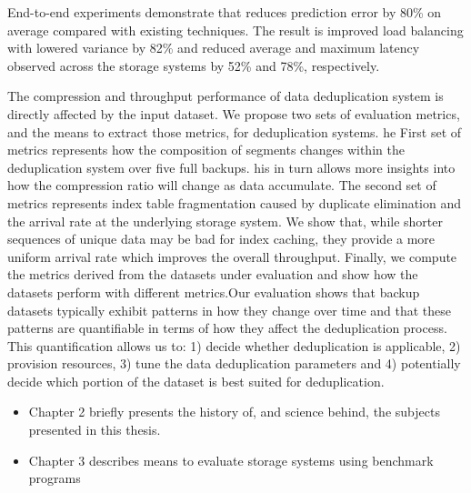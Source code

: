 End-to-end experiments demonstrate that \romano reduces prediction error by 80\% on average compared with existing techniques.
The result is improved load balancing with lowered variance by 82\% and reduced average and maximum latency observed across the storage systems by 52\% and 78\%, respectively.


The compression and throughput performance of data deduplication system is directly affected by the input dataset. 
We propose two sets of evaluation metrics, and the means to extract those metrics, for deduplication systems. 
he First set of metrics represents how the composition of segments changes within the deduplication system over five full backups. 
his in turn allows more insights into how the compression ratio will change as data accumulate.
The second set of metrics represents index table fragmentation caused by duplicate elimination and the arrival rate at the underlying storage system.
We show that, while shorter sequences of unique data may be bad for index caching, they provide a more uniform arrival rate which improves the overall throughput.
Finally, we compute the metrics derived from the datasets  under evaluation and show how the datasets perform with different metrics.Our evaluation shows that backup datasets typically exhibit patterns in how they change over time and that these patterns are quantifiable in terms of how they affect the deduplication process.
This quantification allows us to: 1) decide whether deduplication is applicable, 2) provision resources, 3) tune the data deduplication parameters and 4) potentially decide which portion of the dataset is best suited for deduplication.


\begin{itemize}


\item Chapter 2 briefly presents the history of, and science behind, the
subjects presented in this thesis.

\item Chapter 3 describes means to evaluate storage systems using benchmark programs

\end{itemize}
